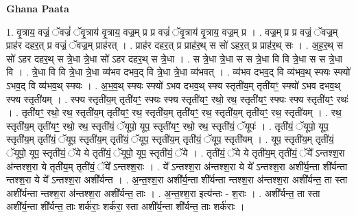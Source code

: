 \documentclass[17pt]{extarticle}
\begin{document}
\textbf{Ghana Paata } \newline

1. वृ॒त्राय॒ वज्रं॒ ॅवज्रं॑ ॅवृ॒त्राय॑ वृ॒त्राय॒ वज्र॒म् प्र प्र वज्रं॑ ॅवृ॒त्राय॑ वृ॒त्राय॒ वज्र॒म् प्र । . वज्र॒म् प्र प्र वज्रं॒ ॅवज्र॒म् प्राह॑र दहर॒त् प्र वज्रं॒ ॅवज्र॒म् प्राह॑रत् । . प्राह॑र दहर॒त् प्र प्राह॑र॒थ् स सो॑ ऽहर॒त् प्र प्राह॑र॒थ् सः । . अ॒ह॒र॒थ् स सो॑ ऽहर दहर॒थ् स त्रे॒धा त्रे॒धा सो॑ ऽहर दहर॒थ् स त्रे॒धा । . स त्रे॒धा त्रे॒धा स स त्रे॒धा वि वि त्रे॒धा स स त्रे॒धा वि । . त्रे॒धा वि वि त्रे॒धा त्रे॒धा व्य॑भव दभव॒द् वि त्रे॒धा त्रे॒धा व्य॑भवत् । . व्य॑भव दभव॒द् वि व्य॑भव॒थ् स्फ्यः स्फ्यो॑ ऽभव॒द् वि व्य॑भव॒थ् स्फ्यः । . अ॒भ॒व॒थ् स्फ्यः स्फ्यो॑ ऽभव दभव॒थ् स्फ्य स्तृती॑य॒म् तृती॑यꣳ॒॒ स्फ्यो॑ ऽभव दभव॒थ् स्फ्य स्तृती॑यम् । . स्फ्य स्तृती॑य॒म् तृती॑यꣳ॒॒ स्फ्यः स्फ्य स्तृती॑यꣳ॒॒ रथो॒ रथ॒ स्तृती॑यꣳ॒॒ स्फ्यः स्फ्य स्तृती॑यꣳ॒॒ रथः॑ । . तृती॑यꣳ॒॒ रथो॒ रथ॒ स्तृती॑य॒म् तृती॑यꣳ॒॒ रथ॒ स्तृती॑य॒म् तृती॑यꣳ॒॒ रथ॒ स्तृती॑य॒म् तृती॑यꣳ॒॒ रथ॒ स्तृती॑यम् । . रथ॒ स्तृती॑य॒म् तृती॑यꣳ॒॒ रथो॒ रथ॒ स्तृती॑यं॒ ॅयूपो॒ यूप॒ स्तृती॑यꣳ॒॒ रथो॒ रथ॒ स्तृती॑यं॒ ॅयूपः॑ । . तृती॑यं॒ ॅयूपो॒ यूप॒ स्तृती॑य॒म् तृती॑यं॒ ॅयूप॒ स्तृती॑य॒म् तृती॑यं॒ ॅयूप॒ स्तृती॑य॒म् तृती॑यं॒ ॅयूप॒ स्तृती॑यम् । . यूप॒ स्तृती॑य॒म् तृती॑यं॒ ॅयूपो॒ यूप॒ स्तृती॑यं॒ ॅये ये तृती॑यं॒ ॅयूपो॒ यूप॒ स्तृती॑यं॒ ॅये । . तृती॑यं॒ ॅये ये तृती॑य॒म् तृती॑यं॒ ॅये᳚ ऽन्तश्श॒रा अ॑न्तश्श॒रा ये तृती॑य॒म् तृती॑यं॒ ॅये᳚ ऽन्तश्श॒राः । . ये᳚ ऽन्तश्श॒रा अ॑न्तश्श॒रा ये ये᳚ ऽन्तश्श॒रा अशी᳚र्य॒न्ता शी᳚र्यन्ता न्तश्श॒रा ये ये᳚ ऽन्तश्श॒रा अशी᳚र्यन्त । . अ॒न्त॒श्श॒रा अशी᳚र्य॒न्ता शी᳚र्यन्ता न्तश्श॒रा अ॑न्तश्श॒रा अशी᳚र्यन्त॒ ता स्ता अशी᳚र्यन्ता न्तश्श॒रा अ॑न्तश्श॒रा अशी᳚र्यन्त॒ ताः । . अ॒न्त॒श्श॒रा इत्य॑न्तः - श॒राः । . अशी᳚र्यन्त॒ ता स्ता अशी᳚र्य॒न्ता शी᳚र्यन्त॒ ताः शर्क॑राः॒ शर्क॑रा॒ स्ता अशी᳚र्य॒न्ता शी᳚र्यन्त॒ ताः शर्क॑राः । \newline
\end{document}
